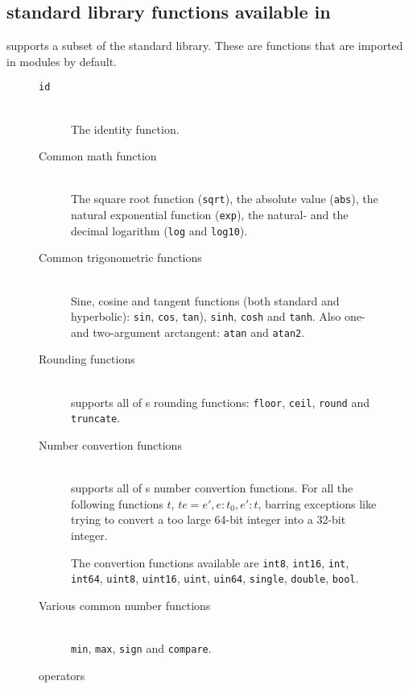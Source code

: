 \subsection{\fsharp{} standard library functions available in \fshark{}}
\fshark{} supports a subset of the \fsharp{} standard library. These are
functions that are imported in \fsharp{} modules by default.

\begin{figure}[h]
  \centering
\begin{description}
\item[\texttt{id}]\hfill\\
  The identity function.

\item[Common math function]\hfill\\
  The square root function (\texttt{sqrt}), the absolute value (\texttt{abs}),
  the natural exponential function (\texttt{exp}), the natural- and the decimal
  logarithm (\texttt{log} and \texttt{log10}).
  
\item[Common trigonometric functions]\hfill\\
  Sine, cosine and tangent functions (both standard and hyperbolic):
  \texttt{sin}, \texttt{cos}, \texttt{tan}), \texttt{sinh}, \texttt{cosh} and \texttt{tanh}.
  Also one- and two-argument arctangent: \texttt{atan} and \texttt{atan2}.

\item[Rounding functions]\hfill\\
  \fshark{} supports all of \fsharp{}s rounding functions:
  \texttt{floor}, \texttt{ceil}, \texttt{round} and \texttt{truncate}.
  
\item[Number convertion functions]\hfill\\
  \fshark{} supports all of \fsharp{}s number convertion functions.
  For all the following functions $t$, $t e = e', e : t_0, e' : t$, barring
  exceptions like trying to convert a too large 64-bit integer into a 32-bit
  integer.

  The convertion functions available are \texttt{int8}, \texttt{int16}, \texttt{int}, \texttt{int64}, \texttt{uint8}, \texttt{uint16},
  \texttt{uint}, \texttt{uin64}, \texttt{single}, \texttt{double}, \texttt{bool}.
  
\item[Various common number functions]\hfill\\
  \texttt{min}, \texttt{max}, \texttt{sign} and \texttt{compare}.
\end{description}
  \caption{\fshark{} operators}
  \label{fig:fsharkfuns}
\end{figure}

